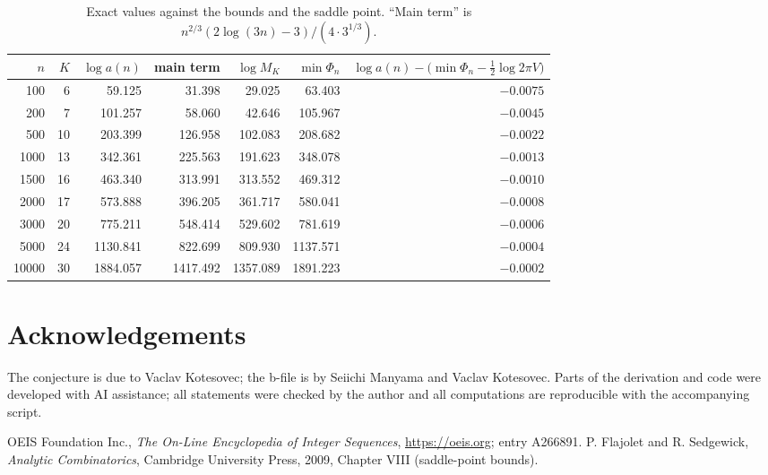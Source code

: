 \documentclass[11pt,a4paper]{article}
\theoremstyle{remark}
\begin{document}
\begin{table}[h]
\centering
\begin{tabular}{rrrrrrr}
\toprule
$n$ & $K$ & $\log a(n)$ & main term & $\log M_K$ & $\min\Phi_n$ & $\log a(n)-\bigl(\min\Phi_n-\frac12\log 2\pi V\bigr)$\\
\midrule
100 & 6 & 59.125 & 31.398 & 29.025 & 63.403 & $-0.0075$\\
200 & 7 & 101.257 & 58.060 & 42.646 & 105.967 & $-0.0045$\\
500 & 10 & 203.399 & 126.958 & 102.083 & 208.682 & $-0.0022$\\
1000 & 13 & 342.361 & 225.563 & 191.623 & 348.078 & $-0.0013$\\
1500 & 16 & 463.340 & 313.991 & 313.552 & 469.312 & $-0.0010$\\
2000 & 17 & 573.888 & 396.205 & 361.717 & 580.041 & $-0.0008$\\
3000 & 20 & 775.211 & 548.414 & 529.602 & 781.619 & $-0.0006$\\
5000 & 24 & 1130.841 & 822.699 & 809.930 & 1137.571 & $-0.0004$\\
10000 & 30 & 1884.057 & 1417.492 & 1357.089 & 1891.223 & $-0.0002$\\
\bottomrule
\end{tabular}
\caption{Exact values against the bounds and the saddle point. ``Main term'' is $n^{2/3}(2\log(3n)-3)/(4\cdot 3^{1/3})$.}\label{tab:num}
\end{table}

\section*{Acknowledgements}
The conjecture is due to Vaclav Kotesovec; the b-file is by Seiichi Manyama and Vaclav Kotesovec. Parts of the derivation and code were developed with AI assistance; all statements were checked by the author and all computations are reproducible with the accompanying script.

\begin{thebibliography}{9}
 OEIS Foundation Inc., \emph{The On-Line Encyclopedia of Integer Sequences}, \url{https://oeis.org}; entry A266891.
 P. Flajolet and R. Sedgewick, \emph{Analytic Combinatorics}, Cambridge University Press, 2009, Chapter VIII (saddle-point bounds).
\end{thebibliography}
\end{document}
